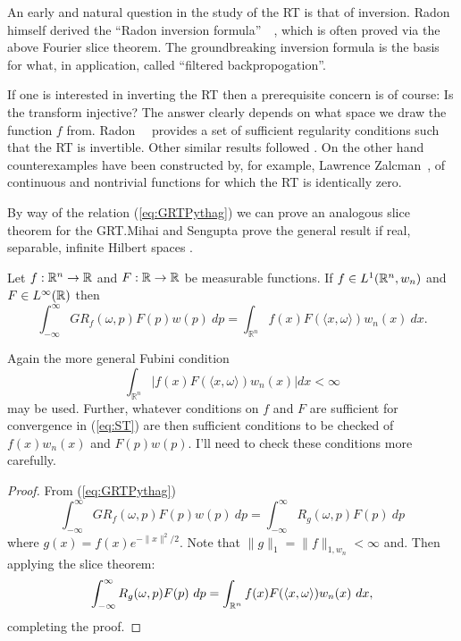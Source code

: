 An early and natural question in the study of the RT is that of inversion. Radon himself derived the ``Radon inversion formula''~\cite{Rado17}~\cite{Rado86}, which is often proved via the above Fourier slice theorem. The groundbreaking inversion formula is the basis for what, in application, called ``filtered backpropogation''.

If one is interested in inverting the RT then a prerequisite concern is of course: Is the transform injective? The answer clearly depends on what space we draw the function $f$ from. Radon~\cite{Rado17}~\cite{Rado86} provides a set of sufficient regularity conditions such that the RT is invertible. Other similar results followed \cite{????}. On the other hand counterexamples have been constructed by, for example, Lawrence Zalcman~\cite{Zalc82}, of continuous and nontrivial functions for which the RT is identically zero.

By way of the relation (\ref{eq:GRTPythag}) we can prove an analogous slice theorem for the GRT.\@ Mihai and Sengupta prove the general result if real, separable, infinite Hilbert spaces \cn.

\begin{proposition} 
  Let $f:\mathbb{R}^n \rightarrow \mathbb{R}$ and $F:\mathbb{R} \rightarrow \mathbb{R}$ be measurable functions. If $f \in L^1(\mathbb{R}^n, w_n)$ and $F \in L^\infty(\mathbb{R})$ then
  \begin{equation}\label{eq:GST}
    \int_{-\infty}^\infty GR_f(\omega, p)F(p) w(p) ~dp
    = \int_{\mathbb{R}^n}f(x) F(\langle x, \omega\rangle) w_n(x) ~dx. 
  \end{equation}
\end{proposition}

\begin{remark}
  Again the more general Fubini condition 
  \[
    \int_{\mathbb{R}^n} |f(x) F(\langle x, \omega\rangle) w_n(x)| dx < \infty
  \]
  may be used. Further, whatever conditions on $f$ and $F$ are sufficient for convergence in (\ref{eq:ST}) are then sufficient conditions to be checked of $f(x)w_n(x)$ and $F(p)w(p)$. I'll need to check these conditions more carefully.
\end{remark}



\begin{proof}
  From (\ref{eq:GRTPythag})
  \[
    \int_{-\infty}^\infty GR_f(\omega, p)F(p) w(p) ~dp 
    = \int_{-\infty}^\infty R_g(\omega, p) F(p) ~dp
  \]
  where $g(x) = f(x)e^{-\|x\|^2/2}$. Note that $\|g\|_1 = \|f\|_{1,w_n} < \infty$ and. Then applying the slice theorem:
  \[
    \int_{-\infty}^\infty R_g(\omega, p) F(p) ~dp 
    = \int_{\mathbb{R}^n} f(x)F(\langle x, \omega \rangle) w_n(x) ~dx,
  \]
  completing the proof.
\end{proof}

